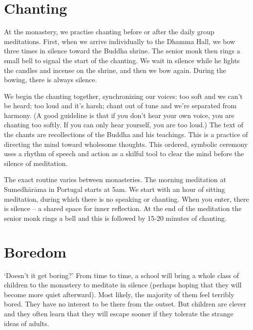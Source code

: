 \section{Chanting}


\noindent At the monastery, we practise chanting before or after the
daily group meditations. First, when we arrive individually to the
Dhamma Hall, we bow three times in silence toward the Buddha shrine. The
senior monk then rings a small bell to signal the start of the chanting.
We wait in silence while he lights the candles and incense on the
shrine, and then we bow again. During the bowing, there is always
silence.

We begin the chanting together, synchronizing our voices: too soft and
we can't be heard; too loud and it's harsh; chant out of tune and we're
separated from harmony. (A good guideline is that if you don't hear your
own voice, you are chanting too softly. If you can only hear yourself,
you are too loud.) The text of the chants are recollections of the
Buddha and his teachings. This is a practice of directing the mind
toward wholesome thoughts. This ordered, symbolic ceremony uses a rhythm
of speech and action as a skilful tool to clear the mind before the
silence of meditation.

The exact routine varies between monasteries. The morning meditation at
Sumedhārāma in Portugal starts at 5am. We start with an hour of sitting
meditation, during which there is no speaking or chanting. When you
enter, there is silence -- a shared space for inner reflection. At the
end of the meditation the senior monk rings a bell and this is followed
by 15-20 minutes of chanting.

\section{Boredom}


\noindent `Doesn't it get boring?' From time to time, a school will
bring a whole class of children to the monastery to meditate in silence
(perhaps hoping that they will become more quiet afterward). Most
likely, the majority of them feel terribly bored. They have no interest
to be there from the outset. But children are clever and they often
learn that they will escape sooner if they tolerate the strange ideas of
adults.

